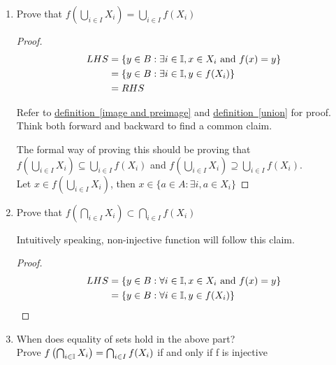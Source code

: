 \documentclass[11pt]{article}
\begin{document}
\begin{enumerate}
  \item Prove that $f\left(\bigcup_{i\in I} X_{i}\right) = \bigcup_{i\in I} f(X_{i})$
    \begin{proof}
      $ $\\
      \[
      \begin{split}
        LHS &= \left\{ y \in B: \exists i\in \mathbb{I}, x\in X_i \text{ and } f(x)=y\right\} \\
        &=  \left\{ y \in B: \exists i\in \mathbb{I}, y\in f(X_i)\right\} \\
        &= RHS
      \end{split}
      \]

    \begin{rem}
      Refer to \hyperref[image and preimage]{definition~\eqref{image and preimage}} and \hyperref[union]{definition~\eqref{union}} for proof. Think both forward and backward to find a common claim.
    \end{rem}
    The formal way of proving this should be proving that $f\left(\bigcup_{i\in I} X_{i}\right) \subseteq \bigcup_{i\in I} f(X_{i})$ and $f\left(\bigcup_{i\in I} X_{i}\right) \supseteq \bigcup_{i\in I} f(X_{i})$. \\
    Let $x\in f\left(\bigcup_{i\in I} X_{i}\right)$, then $x\in \{ a\in A: \exists i, a\in X_i\}$


    \end{proof}

  \item Prove that $f\left(\bigcap_{i\in I} X_{i}\right) \subset \bigcap_{i\in I} f(X_{i})$
    \begin{rem}
      Intuitively speaking, non-injective function will follow this claim.
    \end{rem}
    \begin{proof}
      $ $\\
      \[
      \begin{split}
        LHS &= \left\{ y \in B: \forall i\in \mathbb{I}, x\in X_i \text{ and } f(x)=y\right\} \\
        &= \left\{ y \in B: \forall i\in \mathbb{I}, y\in f(X_i)\right\} \\
      \end{split}
      \]
    \end{proof}
  \item When does equality of sets hold in the above part? \\
    Prove $f\left(\bigcap_{i\in \mathbb{I}} X_{i}\right) = \bigcap_{i\in I} f(X_{i})$ if and only if f is injective


\end{enumerate}
\end{document}
